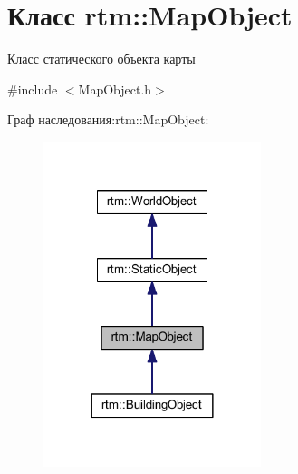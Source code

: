 \hypertarget{classrtm_1_1_map_object}{}\section{Класс rtm\+:\+:Map\+Object}
\label{classrtm_1_1_map_object}


Класс статического объекта карты  




{\ttfamily \#include $<$Map\+Object.\+h$>$}



Граф наследования\+:rtm\+:\+:Map\+Object\+:
\nopagebreak
\begin{figure}[H]
\begin{center}
\leavevmode
\includegraphics[width=180pt]{classrtm_1_1_map_object__inherit__graph}
\end{center}
\end{figure}
